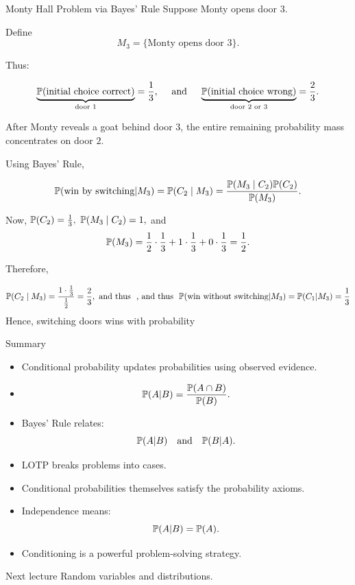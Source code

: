 \begin{frame}{Monty Hall Problem via Bayes' Rule}
    Suppose Monty opens door $3$.

Define
\[
M_3=\{\text{Monty opens door }3\}.
\]

Thus:

\[
\underbrace{\mathbb{P}(\text{initial choice correct})}_{\text{door }1}
=
\frac13, \quad \text{ and }  \quad \underbrace{\mathbb{P}(\text{initial choice wrong})}_{\text{door }2\text{ or }3}
=
\frac23.
\]



\vspace{0.2cm}

After Monty reveals a goat behind door $3$,
the entire remaining probability mass concentrates on door $2$.

Using Bayes' Rule,

\[
\mathbb{P}(\text{win by switching}|M_3) = \mathbb{P}(C_2\mid M_3)
=
\frac{\mathbb{P}(M_3\mid C_2)\mathbb{P}(C_2)}
{\mathbb{P}(M_3)}.
\]

Now, $\mathbb{P}(C_2)=\frac13,$ $\mathbb{P}(M_3\mid C_2)=1,$ and
\[
\mathbb{P}(M_3)
=
\frac12\cdot\frac13
+
1\cdot\frac13
+
0\cdot\frac13
=
\frac12.
\]

Therefore,

\[
\mathbb{P}(C_2\mid M_3)
=
\frac{1\cdot\frac13}{\frac12}
=
{\frac23}, \text{ and thus}\ \ \text{, and thus } \ \mathbb{P}(\text{win without switching} | M_3) = \mathbb{P}(C_1|M_3) = \frac{1}{3}
\]
Hence, switching doors wins with probability

\end{frame}

\begin{frame}{Summary}
\begin{itemize}
    \item Conditional probability updates probabilities using observed evidence.

    \item
    \[
    \mathbb{P}(A|B)
    =
    \frac{\mathbb{P}(A\cap B)}{\mathbb{P}(B)}.
    \]

    \item Bayes' Rule relates:
    \[
    \mathbb{P}(A|B)
    \quad \text{and} \quad
    \mathbb{P}(B|A).
    \]

    \item LOTP breaks problems into cases.

    \item Conditional probabilities themselves satisfy the probability axioms.

    \item Independence means:
    \[
    \mathbb{P}(A|B)=\mathbb{P}(A).
    \]

    \item Conditioning is a powerful problem-solving strategy.
\end{itemize}

\vspace{0.25cm}

\begin{keybox}{Next lecture}
Random variables and distributions.
\end{keybox}
\end{frame}